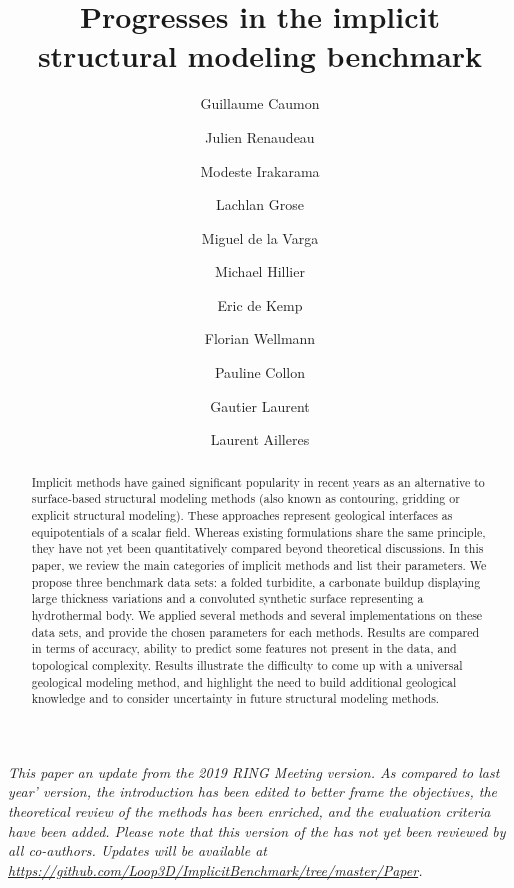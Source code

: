 \documentclass[final]{ring20}
\title{Progresses in the implicit structural modeling benchmark}
\author[1]{Guillaume Caumon}
\author[1,2]{Julien Renaudeau}
\author[1]{Modeste Irakarama}
\author[3]{Lachlan Grose}
\author[5]{Miguel de la Varga}
\author[7]{Michael Hillier}
\author[7]{Eric de Kemp}
\author[5]{Florian Wellmann}
\author[1]{Pauline Collon}
\author[4]{Gautier Laurent}
\author[3]{Laurent Ailleres}
\affil[1]{RING, GeoRessources / ENSG, Universit\'e de Lorraine / CNRS, France}
\affil[2]{Schlumberger, France}
\affil[3]{Monash University, Australia}
\affil[4]{Univ. Orl\'eans, CNRS, BRGM, ISTO, France}
\affil[5]{RWTH Aachen, Germany}
\affil[6]{BRGM, France}
\affil[7]{NRCan, Canada}
\begin{document}
\maketitle

\begin{abstract}

Implicit methods have gained significant popularity in recent years as 
an alternative to surface-based structural modeling methods (also known as 
contouring, gridding or explicit structural modeling). These approaches represent 
geological interfaces as equipotentials of a scalar field. 
Whereas existing formulations share the same principle, they have not yet been 
quantitatively compared beyond theoretical discussions. In this paper, we review 
the main categories of implicit methods and list their parameters. We propose 
three benchmark data sets: a folded turbidite, a carbonate buildup 
displaying large thickness variations and a convoluted synthetic surface 
representing a hydrothermal body. We applied several methods and several 
implementations on these data sets, and provide the chosen parameters for each 
methods. Results are compared in terms of accuracy, ability to predict 
some features not present in the data, and topological complexity. 
Results illustrate the difficulty to come up with a universal geological 
modeling method, and highlight the need to build additional geological 
knowledge and to consider uncertainty in future structural modeling methods.  

\end{abstract}




\textit{This paper an update from the 2019 RING Meeting version. As compared to last year' version, the introduction has been edited to better frame the objectives, the theoretical review of the methods has been enriched, and the evaluation criteria have been added. Please note that this version of the has not yet been reviewed by all co-authors. Updates will be available at \url{https://github.com/Loop3D/ImplicitBenchmark/tree/master/Paper}.}
\end{document}
